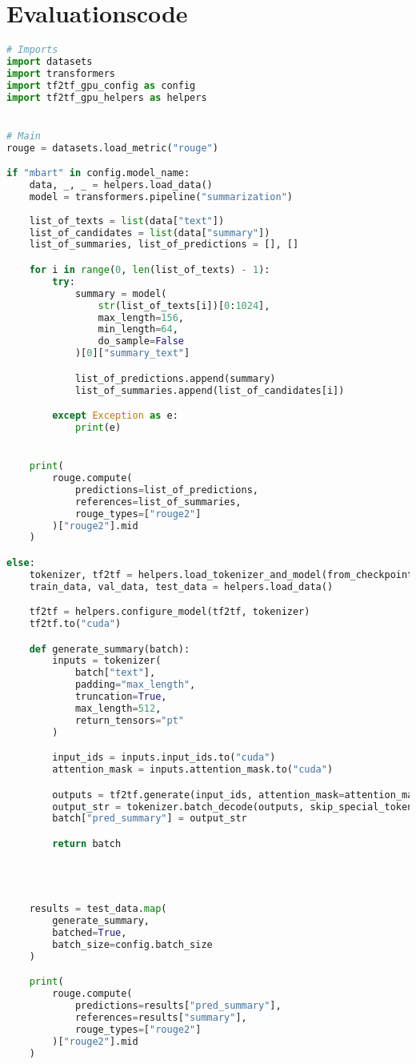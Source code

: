 \section*{Evaluationscode}
\begin{lstlisting}[language=Python, caption=Evaluationscode]
# Imports
import datasets
import transformers
import tf2tf_gpu_config as config
import tf2tf_gpu_helpers as helpers


# Main
rouge = datasets.load_metric("rouge")

if "mbart" in config.model_name:
    data, _, _ = helpers.load_data()
    model = transformers.pipeline("summarization")
    
    list_of_texts = list(data["text"])
    list_of_candidates = list(data["summary"])
    list_of_summaries, list_of_predictions = [], []   

    for i in range(0, len(list_of_texts) - 1):
        try:
            summary = model(
                str(list_of_texts[i])[0:1024],
                max_length=156,
                min_length=64,
                do_sample=False
            )[0]["summary_text"]

            list_of_predictions.append(summary)
            list_of_summaries.append(list_of_candidates[i])

        except Exception as e:
            print(e)


    print(
        rouge.compute(
            predictions=list_of_predictions,
            references=list_of_summaries,
            rouge_types=["rouge2"]
        )["rouge2"].mid
    )

else:
    tokenizer, tf2tf = helpers.load_tokenizer_and_model(from_checkpoint=True)
    train_data, val_data, test_data = helpers.load_data()

    tf2tf = helpers.configure_model(tf2tf, tokenizer)
    tf2tf.to("cuda")

    def generate_summary(batch):
        inputs = tokenizer(
            batch["text"],
            padding="max_length",
            truncation=True,
            max_length=512,
            return_tensors="pt"
        )

        input_ids = inputs.input_ids.to("cuda")
        attention_mask = inputs.attention_mask.to("cuda")

        outputs = tf2tf.generate(input_ids, attention_mask=attention_mask)
        output_str = tokenizer.batch_decode(outputs, skip_special_tokens=True)
        batch["pred_summary"] = output_str

        return batch




    results = test_data.map(
        generate_summary,
        batched=True,
        batch_size=config.batch_size
    )

    print(
        rouge.compute(
            predictions=results["pred_summary"],
            references=results["summary"],
            rouge_types=["rouge2"]
        )["rouge2"].mid
    )
\end{lstlisting}
\newpage


